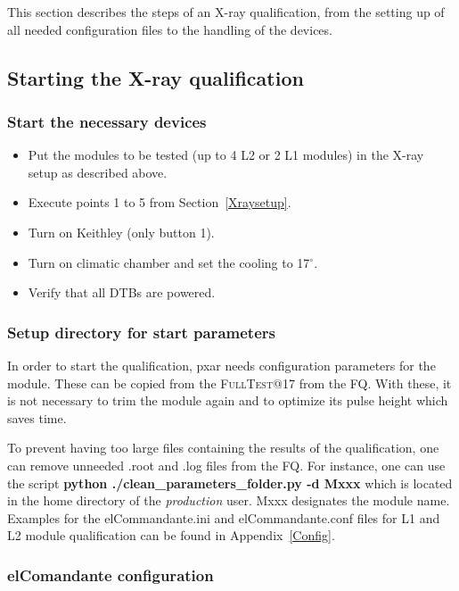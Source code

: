 \documentclass[a4paper,12pt,twoside]{article}
\newcommand{\testname}[1]{{\color{Darkcyan} \textsc{#1}}}
\begin{document}
This section describes the steps of an X-ray qualification, from the setting up of all needed configuration files to the handling of the devices. 

\subsection{Starting the X-ray qualification}

\subsubsection{Start the necessary devices}

\begin{itemize}
\item Put the modules to be tested (up to 4 L2 or 2 L1 modules) in the X-ray setup as described above.
\item Execute points 1 to 5 from Section~\ref{Xraysetup}.
\item Turn on Keithley (only button 1).
\item Turn on climatic chamber and set the cooling to 17$^{\circ}$.
\item Verify that all DTBs are powered.
\end{itemize}

\subsubsection{Setup directory for start parameters}

In order to start the qualification, pxar needs configuration parameters for the module. These can be copied from the \testname{FullTest}@17 from the FQ. With these, it is not necessary to trim the module again and to optimize its pulse height which saves time.

To prevent having too large files containing the results of the qualification, one can remove unneeded .root and .log files from the FQ. For instance, one can use the script \textbf{python ./clean\_parameters\_folder.py -d Mxxx} which is located in the home directory of the \textit{production} user. Mxxx designates the module name. \\

Examples for the elCommandante.ini and elCommandante.conf files for L1 and L2 module qualification can be found in Appendix~\ref{Config}.

\subsubsection{elComandante configuration}
\end{document}
